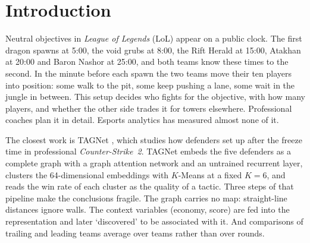 
\section{Introduction}
\label{sec:intro}

Neutral objectives in \emph{League of Legends} (LoL) appear on a public clock.
The first dragon spawns at 5:00, the void grubs at 8:00, the Rift Herald at 15:00, Atakhan at 20:00 and Baron Nashor at 25:00, and both teams know these times to the second.
In the minute before each spawn the two teams move their ten players into position: some walk to the pit, some keep pushing a lane, some wait in the jungle in between.
This setup decides who fights for the objective, with how many players, and whether the other side trades it for towers elsewhere.
Professional coaches plan it in detail. Esports analytics has measured almost none of it.

The closest work is TAGNet \citep{zhang2026tagnet}, which studies how defenders set up after the freeze time in professional \emph{Counter-Strike~2}.
TAGNet embeds the five defenders as a complete graph with a graph attention network \citep{velickovic2018graph} and an untrained recurrent layer, clusters the 64-dimensional embeddings with $K$-Means at a fixed $K=6$, and reads the win rate of each cluster as the quality of a tactic.
Three steps of that pipeline make the conclusions fragile.
The graph carries no map: straight-line distances ignore walls.
The context variables (economy, score) are fed into the representation and later `discovered' to be associated with it.
And comparisons of trailing and leading teams average over teams rather than over rounds.


